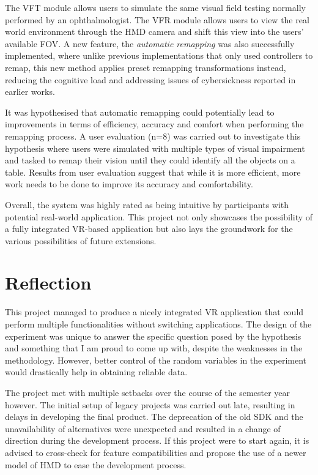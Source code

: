 \documentclass{l4proj}
\begin{document}
The VFT module allows users to simulate the same visual field testing normally performed by an ophthalmologist. The VFR module allows users to view the real world environment through the HMD camera and shift this view into the users' available FOV. A new feature, the \textit{automatic remapping} was also successfully implemented, where unlike previous implementations that only used controllers to remap, this new method applies preset remapping transformations instead, reducing the cognitive load and addressing issues of cybersickness reported in earlier works.

It was hypothesised that automatic remapping could potentially lead to improvements in terms of efficiency, accuracy and comfort when performing the remapping process. A user evaluation (n=8) was carried out to investigate this hypothesis where users were simulated with multiple types of visual impairment and tasked to remap their vision until they could identify all the objects on a table. Results from user evaluation suggest that while it is more efficient, more work needs to be done to improve its accuracy and comfortability. 

Overall, the system was highly rated as being intuitive by participants with potential real-world application. This project not only showcases the possibility of a fully integrated VR-based application but also lays the groundwork for the various possibilities of future extensions.

\section{Reflection}

This project managed to produce a nicely integrated VR application that could perform multiple functionalities without switching applications. The design of the experiment was unique to answer the specific question posed by the hypothesis and something that I am proud to come up with, despite the weaknesses in the methodology. However, better control of the random variables in the experiment would drastically help in obtaining reliable data.

The project met with multiple setbacks over the course of the semester year however. The initial setup of legacy projects was carried out late, resulting in delays in developing the final product. The deprecation of the old SDK and the unavailability of alternatives were unexpected and resulted in a change of direction during the development process. If this project were to start again, it is advised to cross-check for feature compatibilities and propose the use of a newer model of HMD to ease the development process.
\end{document}
